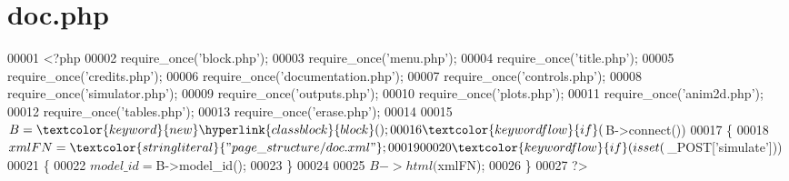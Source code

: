 \hypertarget{doc_8php_source}{\section{doc.\-php}
}

\begin{DoxyCode}
00001 <?php
00002 require\_once(\textcolor{stringliteral}{'block.php'});
00003 require\_once(\textcolor{stringliteral}{'menu.php'});
00004 require\_once(\textcolor{stringliteral}{'title.php'});
00005 require\_once(\textcolor{stringliteral}{'credits.php'});
00006 require\_once(\textcolor{stringliteral}{'documentation.php'});
00007 require\_once(\textcolor{stringliteral}{'controls.php'});
00008 require\_once(\textcolor{stringliteral}{'simulator.php'});
00009 require\_once(\textcolor{stringliteral}{'outputs.php'});
00010 require\_once(\textcolor{stringliteral}{'plots.php'});
00011 require\_once(\textcolor{stringliteral}{'anim2d.php'});
00012 require\_once(\textcolor{stringliteral}{'tables.php'});
00013 require\_once(\textcolor{stringliteral}{'erase.php'});
00014 
00015 $B=\textcolor{keyword}{new} \hyperlink{classblock}{block}();
00016 \textcolor{keywordflow}{if}($B->connect())
00017 \{
00018   $xmlFN=\textcolor{stringliteral}{"page\_structure/doc.xml"};
00019 
00020   \textcolor{keywordflow}{if}(isset($\_POST[\textcolor{stringliteral}{'simulate'}]))
00021   \{
00022     $model\_id=$B->model\_id();
00023   \}
00024 
00025   $B->html($xmlFN);
00026 \}
00027 ?>
\end{DoxyCode}
